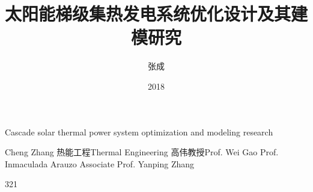 \makenomenclature

\title{太阳能梯级集热发电系统优化设计及其建模研究}{Cascade solar thermal power system optimization and modeling research}
\author
{张成}{Cheng Zhang}
\major
{热能工程}{Thermal Engineering}
\supervisor
{高伟\hspace{0.2em}教授}{Prof. Wei Gao \newline Prof. Inmaculada Arauzo \newline Associate Prof. Yanping Zhang}
\date{2018}{3}{21}